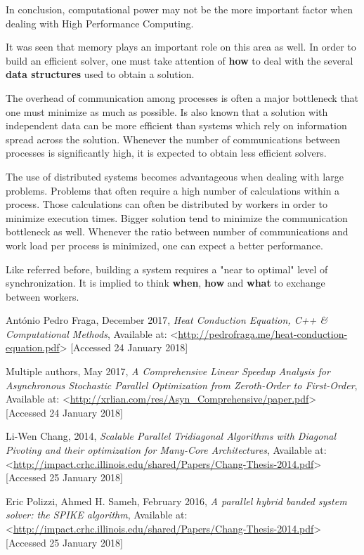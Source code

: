 \documentclass[12pt]{article}
\begin{document}
\par In conclusion, computational power may not be the more important factor when dealing with High Performance Computing.
\par It was seen that memory plays an important role on this area as well. In order to build an efficient solver, one must take attention of \textbf{how} to deal with the several \textbf{data structures} used to obtain a solution. 
\par The overhead of communication among processes is often a major bottleneck that one must minimize as much as possible. Is also known that a solution with independent data can be more efficient than systems which rely on information spread across the solution. Whenever the number of communications between processes is significantly high, it is expected to obtain less efficient solvers.  
\par The use of distributed systems becomes advantageous when dealing with large problems. Problems that often require a high number of calculations within a process. Those calculations can often be distributed by workers in order to minimize execution times. Bigger solution tend to minimize the communication bottleneck as well. Whenever the ratio between number of communications and work load per process is minimized, one can expect a better performance.
\par Like referred before, building a system requires a "near to optimal" level of synchronization. It is implied to think \textbf{when}, \textbf{how} and \textbf{what} to exchange between workers. 


\newpage
\begin{thebibliography}{0}

António Pedro Fraga, December 2017, \textit{Heat Conduction Equation, C++ \& Computational Methods}, Available at: <\url{http://pedrofraga.me/heat-conduction-equation.pdf}> [Accessed 24 January 2018]

Multiple authors, May 2017, \textit{A Comprehensive Linear Speedup Analysis for Asynchronous Stochastic Parallel Optimization from Zeroth-Order to First-Order}, Available at: <\url{http://xrlian.com/res/Asyn_Comprehensive/paper.pdf}> [Accessed 24 January 2018]

Li-Wen Chang, 2014, \textit{Scalable Parallel Tridiagonal Algorithms with Diagonal Pivoting and their optimization for Many-Core Architectures}, Available at: <\url{http://impact.crhc.illinois.edu/shared/Papers/Chang-Thesis-2014.pdf}> [Accessed 25 January 2018]

Eric Polizzi, Ahmed H. Sameh, February 2016, \textit{A parallel hybrid banded system solver: the SPIKE algorithm}, Available at: <\url{http://impact.crhc.illinois.edu/shared/Papers/Chang-Thesis-2014.pdf}> [Accessed 25 January 2018]


\end{thebibliography}
\newpage
\end{document}
